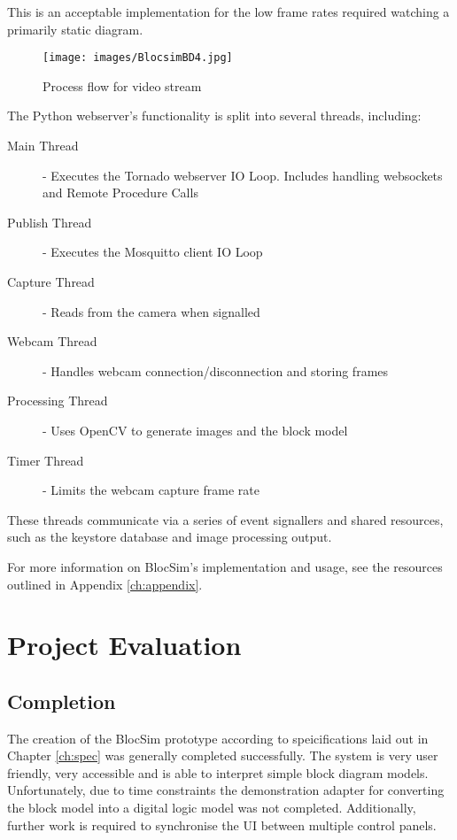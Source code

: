 This is an acceptable implementation for the low frame rates required watching a primarily static diagram.

\begin{figure}[ht!]
\centering
\texttt{[image: images/BlocsimBD4.jpg]}
\caption{Process flow for video stream}
\label{im:BlocsimBD4}
\end{figure}


\noindent The Python webserver's functionality is split into several threads, including:

\begin{description}
	\item[Main Thread] - Executes the Tornado webserver IO Loop. Includes handling websockets and Remote Procedure Calls
	\item[Publish Thread] - Executes the Mosquitto client IO Loop
	\item[Capture Thread] - Reads from the camera when signalled
	\item[Webcam Thread] - Handles webcam connection/disconnection and storing frames
	\item[Processing Thread] - Uses OpenCV to generate images and the block model
	\item[Timer Thread] - Limits the webcam capture frame rate
\end{description}

\noindent These threads communicate via a series of event signallers and shared resources, such as the keystore database and image processing output.

\vspace{1 cm}

\noindent For more information on BlocSim's implementation and usage, see the resources outlined in Appendix \ref{ch:appendix}.



\chapter{Project Evaluation}

\section{Completion}

The creation of the BlocSim prototype according to speicifications laid out in Chapter \ref{ch:spec} was generally completed successfully. The system is very user friendly, very accessible and is able to interpret simple block diagram models. Unfortunately, due to time constraints the demonstration adapter for converting the block model into a digital logic model was not completed. Additionally, further work is required to synchronise the UI between multiple control panels.

